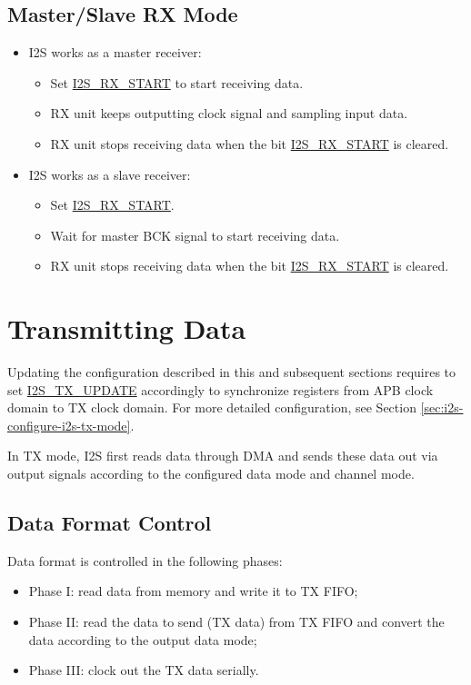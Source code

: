 \documentclass[main\_\_EN.tex]{subfiles}
\begin{document}
\subsection{Master/Slave RX Mode}
\begin{itemize}
    \item I2S works as a master receiver:
    \begin{itemize}
        \item Set  \hyperref[fielddesc:I2SRXSTART]{I2S\_RX\_START} to start receiving data.
        \item RX unit keeps outputting clock signal and sampling input data.
        \item RX unit stops receiving data when the bit  \hyperref[fielddesc:I2SRXSTART]{I2S\_RX\_START} is cleared.
    \end{itemize}
    \item I2S works as a slave receiver:
     \begin{itemize}
        \item Set  \hyperref[fielddesc:I2SRXSTART]{I2S\_RX\_START}.
        \item Wait for master BCK signal to start receiving data.
        \item RX unit stops receiving data when the bit \hyperref[fielddesc:I2SRXSTART]{I2S\_RX\_START} is cleared.
    \end{itemize}
\end{itemize}

\section{Transmitting Data}\label{sec:i2s-tx-data}

\vspace{1em}
\begin{tiplisting}
Updating the configuration described in this and subsequent sections requires to set \hyperref[fielddesc:I2STXUPDATE]{I2S\_TX\_UPDATE} accordingly to synchronize registers from APB clock domain to TX clock domain. For more detailed configuration, see Section \ref{sec:i2s-configure-i2s-tx-mode}.
\end{tiplisting}

\vspace{-1em}
In TX mode, I2S first reads data through DMA and sends these data out via output signals according to the configured data mode and channel mode.
\subsection{Data Format Control}\label{sec:i2s-data-control}
Data format is controlled in the following phases:
\begin{itemize}
    \item Phase I: read data from memory and write it to TX FIFO;
    \item Phase II: read the data to send (TX data) from TX FIFO and convert the data according to the output data mode;
    \item Phase III: clock out the TX data serially.
\end{itemize}
\end{document}
